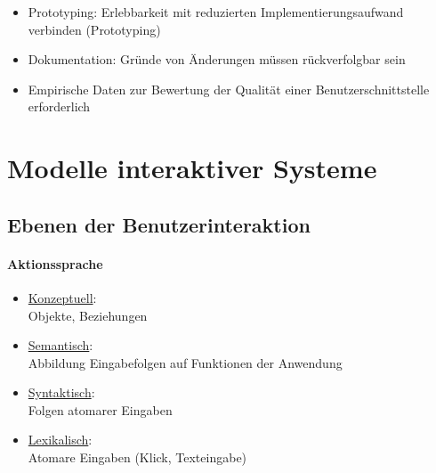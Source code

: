\documentclass
[
	8pt,		%
	ngerman,	%
	a4paper,	%
	landscape,	%
	final		%
]{extarticle}
\begin{document}
\begin{multicols*}{4}
\begin{itemize}
\begin{itemize}[nolistsep]
\begin{itemize}[nolistsep]
				            \item Prototyping: Erlebbarkeit mit reduzierten
				                  Implementierungsaufwand verbinden (Prototyping)
				            \item Dokumentation: Gründe von Änderungen müssen
				                  rückverfolgbar sein
			            \end{itemize}
		      \end{itemize}
		      \begin{itemize}[nolistsep]
			      \item Empirische Daten zur Bewertung der Qualität einer
			            Benutzerschnittstelle erforderlich
		      \end{itemize}
	\end{itemize}
	\section{Modelle interaktiver Systeme}
	\subsection{Ebenen der Benutzerinteraktion}
	{
		\setlength{\columnseprule}{0pt}
		\begin{multicols*}{2}
			\paragraph{Aktionssprache}
			\begin{itemize}
				\item \underline{Konzeptuell}:\\
				      Objekte, Beziehungen
				\item \underline{Semantisch}:\\
				      Abbildung Eingabefolgen auf Funktionen der Anwendung
				\item \underline{Syntaktisch}:\\
				      Folgen atomarer Eingaben
				\item \underline{Lexikalisch}:\\
				      Atomare Eingaben (Klick, Texteingabe)
			\end{itemize}
			\columnbreak

\end{multicols*}}
\end{multicols*}
\end{document}
